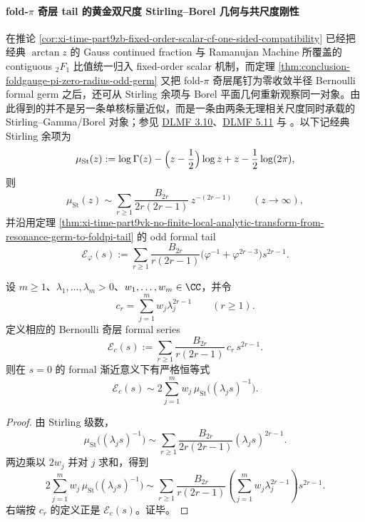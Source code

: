 \paragraph{fold-\texorpdfstring{$\pi$}{pi} 奇层 tail 的黄金双尺度 Stirling--Borel 几何与共尺度刚性}
在推论 \ref{cor:xi-time-part9zb-fixed-order-scalar-cf-one-sided-compatibility} 已经把经典 \(\arctan z\) 的 Gauss continued fraction 与 Ramanujan Machine 所覆盖的 contiguous \({}_2F_1\) 比值统一归入 fixed-order scalar 机制，而定理 \ref{thm:conclusion-foldgauge-pi-zero-radius-odd-germ} 又把 fold-\(\pi\) 奇层尾钉为零收敛半径 Bernoulli formal germ 之后，还可从 Stirling 余项与 Borel 平面几何重新观察同一对象。由此得到的并不是另一条单核标量近似，而是一条由两条无理相关尺度同时承载的 Stirling--Gamma/Borel 对象；参见 \href{https://dlmf.nist.gov/3.10}{DLMF 3.10}、\href{https://dlmf.nist.gov/5.11}{DLMF 5.11} 与 \cite{Wang2026RamanujanMachinePi}。以下记经典 Stirling 余项为
\[
\mu_{\mathrm{St}}(z):=
\log\Gamma(z)-\Bigl(z-\frac12\Bigr)\log z+z-\frac12\log(2\pi),
\]
则
\[
\mu_{\mathrm{St}}(z)\sim \sum_{r\ge 1}\frac{B_{2r}}{2r(2r-1)}\,z^{-(2r-1)}
\qquad (z\to\infty),
\]
并沿用定理 \ref{thm:xi-time-part9vk-no-finite-local-analytic-transform-from-resonance-germ-to-foldpi-tail} 的 odd formal tail
\[
\mathcal E_\varphi(s):=
\sum_{r\ge 1}
\frac{B_{2r}}{r(2r-1)}
\bigl(\varphi^{-1}+\varphi^{2r-3}\bigr)s^{2r-1}.
\]

\begin{theorem}\label{thm:xi-time-part9zbb-finite-stirling-sum-translation}
设 \(m\ge 1\)、\(\lambda_1,\dots,\lambda_m>0\)、\(w_1,\dots,w_m\in\CC\)，并令
\[
c_r=\sum_{j=1}^{m}w_j\lambda_j^{2r-1}
\qquad (r\ge 1).
\]
定义相应的 Bernoulli 奇层 formal series
\[
\mathcal E_c(s):=
\sum_{r\ge 1}\frac{B_{2r}}{r(2r-1)}\,c_r\,s^{2r-1}.
\]
则在 \(s=0\) 的 formal 渐近意义下有严格恒等式
\[
\mathcal E_c(s)\sim 2\sum_{j=1}^{m}w_j\,\mu_{\mathrm{St}}\!\bigl((\lambda_j s)^{-1}\bigr).
\]
\end{theorem}
\begin{proof}
由 Stirling 级数，
\[
\mu_{\mathrm{St}}\!\bigl((\lambda_j s)^{-1}\bigr)
\sim
\sum_{r\ge 1}\frac{B_{2r}}{2r(2r-1)}(\lambda_j s)^{2r-1}.
\]
两边乘以 \(2w_j\) 并对 \(j\) 求和，得到
\[
2\sum_{j=1}^{m}w_j\,\mu_{\mathrm{St}}\!\bigl((\lambda_j s)^{-1}\bigr)
\sim
\sum_{r\ge 1}
\frac{B_{2r}}{r(2r-1)}
\left(\sum_{j=1}^{m}w_j\lambda_j^{2r-1}\right)s^{2r-1}.
\]
右端按 \(c_r\) 的定义正是 \(\mathcal E_c(s)\)。证毕。
\end{proof}

